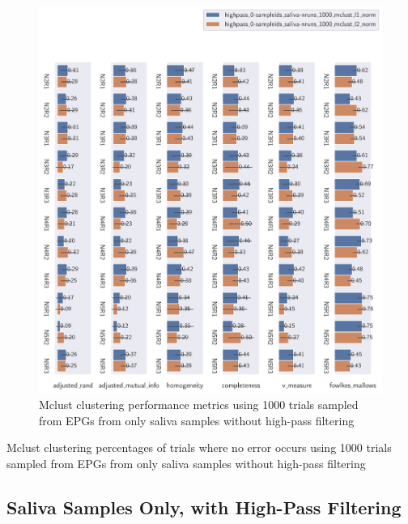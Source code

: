\begin{theappendices}
\begin{figure}[H]
\centering
\includegraphics[width=\textwidth]{./figures/clust_comparison/highpass_0-sampleids_saliva-nruns_1000_mclust.pdf}
\caption{Mclust clustering performance metrics using 1000 trials sampled from EPGs from only saliva samples without high-pass filtering}
\label{fig:highpass_0-sampleids_saliva-nruns_1000_mclust}
\end{figure}

\begin{table}[H]
\centering
{}
\caption{Mclust clustering percentages of trials where no error occurs using 1000 trials sampled from EPGs from only saliva samples without high-pass filtering}
\label{table:highpass_0-sampleids_saliva-nruns_1000_mclust}
\end{table}

\subsection{Saliva Samples Only, with High-Pass Filtering}


\end{theappendices}
